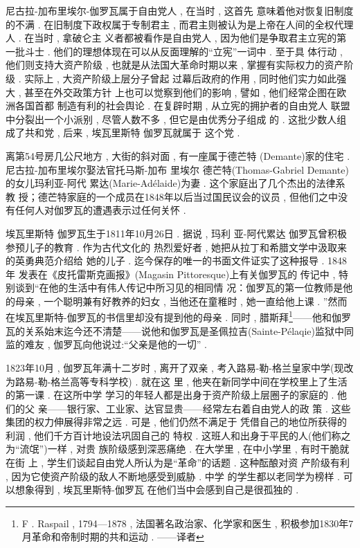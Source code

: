尼古拉-加布里埃尔-伽罗瓦属于自由党人 , 在当时 , 这首先 意味着他对恢复旧制度的不满 . 在旧制度下政权属于专制君主 , 而君主则被认为是上帝在人间的全权代理人 . 在当时 , 拿破仑主 义者都被看作是自由党人 , 因为他们是争取君主立宪的第一批斗士 . 他们的理想体现在可以从反面理解的“立宪”一词中 . 至于具 体行动 , 他们则支持大资产阶级 , 也就是从法国大革命时期以来 , 掌握有实际权力的资产阶级 . 实际上 , 大资产阶级上层分子曾起 过幕后政府的作用 , 同时他们实力如此强大 , 甚至在外交政策方针 上也可以觉察到他们的影响 , 譬如 , 他们经常企图在欧洲各国首都 制造有利的社会舆论 . 在复辟时期 , 从立宪的拥护者的自由党人 联盟中分裂出一个小派别 , 尽管人数不多 , 但它是由优秀分子组成 的 . 这批少数人组成了共和党 , 后来 , 埃瓦里斯特 \textbullet 伽罗瓦就属于 这个党 . 

离第54号房几公尺地方 , 大街的斜对面 , 有一座属于德芒特 (Demante)家的住宅 . 尼古拉-加布里埃尔娶法官托马斯-加布 里埃尔 \textbullet 德芒特(Thomas-Gabriel Demante)的女儿玛利亚-阿代 累达(Marie-Adélaide)为妻 . 这个家庭出了几个杰出的法律系教 授；德芒特家庭的一个成员在1848年以后当过国民议会的议员 ,  但他们之中没有任何人对伽罗瓦的遭遇表示过任何关怀 . 

埃瓦里斯特 \textbullet 伽罗瓦生于1811年10月26日 . 据说 , 玛利 亚-阿代累达 \textbullet 伽罗瓦曾积极参预儿子的教育 . 作为古代文化的 热烈爱好者 , 她把从拉丁和希腊文学中汲取来的英勇典范介绍给 她的儿子 . 迄今保存的唯一的书面文件证实了这种报导 . 1848年 发表在《皮托雷斯克画报》(Magasin Pittoresque)上有关伽罗瓦的 传记中 , 特别谈到“在他的生活中有伟人传记中所习见的相同情 况：伽罗瓦的第一位教师是他的母亲 , 一个聪明兼有好教养的妇女 , 当他还在童稚时 , 她一直给他上课 . ”然而在埃瓦里斯特-伽罗瓦的书信里却没有提到他的母亲 . 同时 , 腊斯拜\footnote{F . Raspail , 1794—1878 , 法国著名政治家、化学家和医生 , 积极参加1830年7 月革命和帝制时期的共和运动 . ——译者}——他和伽罗瓦的关系始末迄今还不清楚——说他和伽罗瓦是圣佩拉吉(Sainte-Pélaqie)监狱中同监的难友 , 伽罗瓦向他说过:“父亲是他的一切” . 

1823年10月 , 伽罗瓦年满十二岁时 , 离开了双亲 , 考入路易-勒-格兰皇家中学(现改为路易-勒-格兰高等专科学校) . 就在这 里 , 他夹在新同学中间在学校里上了生活的第一课 . 在这所中学 学习的年轻人都是出身于资产阶级上层圈子的家庭的 . 他们的父 亲——银行家、工业家、达官显贵——经常左右着自由党人的政 策 . 这些集团的权力伸展得非常之远 . 可是 , 他们仍然不满足于 凭借自己的地位所获得的利润 , 他们千方百计地设法巩固自己的 特权 . 这班人和出身于平民的人(他们称之为“流氓”)一样 , 对贵 族阶级感到深恶痛绝 . 在大学里 , 在中小学里 , 有时干脆就在街 上 , 学生们谈起自由党人所认为是“革命”的话题 . 这种酝酿对资 产阶级有利 , 因为它使资产阶级的敌人不断地感受到威胁 . 中学 的学生都以老同学为榜样 . 可以想象得到 , 埃瓦里斯特-伽罗瓦 在他们当中会感到自己是很孤独的 . 

